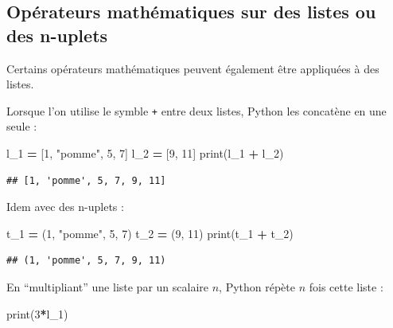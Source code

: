 \documentclass[
  12pt,
]{book}
\newenvironment{Shaded}{\begin{snugshade}}{\end{snugshade}}
\newcommand{\BuiltInTok}[1]{#1}
\newcommand{\DecValTok}[1]{\textcolor[rgb]{0.00,0.00,0.81}{#1}}
\newcommand{\NormalTok}[1]{#1}
\newcommand{\OperatorTok}[1]{\textcolor[rgb]{0.81,0.36,0.00}{\textbf{#1}}}
\newcommand{\StringTok}[1]{\textcolor[rgb]{0.31,0.60,0.02}{#1}}
\numberwithin{equation}{section}
\numberwithin{countremarque}{section}
\begin{document}
\subsection{Opérateurs mathématiques sur des listes ou des n-uplets}\label{opuxe9rateurs-mathuxe9matiques-sur-des-listes-ou-des-n-uplets}

Certains opérateurs mathématiques peuvent également être appliquées à des listes.

Lorsque l'on utilise le symble \texttt{+} entre deux listes, Python les concatène en une seule :

\begin{Shaded}
\begin{Highlighting}[]
\NormalTok{l\_1 }\OperatorTok{=}\NormalTok{ [}\DecValTok{1}\NormalTok{, }\StringTok{"pomme"}\NormalTok{, }\DecValTok{5}\NormalTok{, }\DecValTok{7}\NormalTok{]}
\NormalTok{l\_2 }\OperatorTok{=}\NormalTok{ [}\DecValTok{9}\NormalTok{, }\DecValTok{11}\NormalTok{]}
\BuiltInTok{print}\NormalTok{(l\_1 }\OperatorTok{+}\NormalTok{ l\_2)}
\end{Highlighting}
\end{Shaded}

\begin{lstlisting}
## [1, 'pomme', 5, 7, 9, 11]
\end{lstlisting}

Idem avec des n-uplets :

\begin{Shaded}
\begin{Highlighting}[]
\NormalTok{t\_1 }\OperatorTok{=}\NormalTok{ (}\DecValTok{1}\NormalTok{, }\StringTok{"pomme"}\NormalTok{, }\DecValTok{5}\NormalTok{, }\DecValTok{7}\NormalTok{)}
\NormalTok{t\_2 }\OperatorTok{=}\NormalTok{ (}\DecValTok{9}\NormalTok{, }\DecValTok{11}\NormalTok{)}
\BuiltInTok{print}\NormalTok{(t\_1 }\OperatorTok{+}\NormalTok{ t\_2)}
\end{Highlighting}
\end{Shaded}

\begin{lstlisting}
## (1, 'pomme', 5, 7, 9, 11)
\end{lstlisting}

En ``multipliant'' une liste par un scalaire \(n\), Python répète \(n\) fois cette liste :

\begin{Shaded}
\begin{Highlighting}[]
\BuiltInTok{print}\NormalTok{(}\DecValTok{3}\OperatorTok{*}\NormalTok{l\_1)}
\end{Highlighting}
\end{Shaded}
\end{document}
